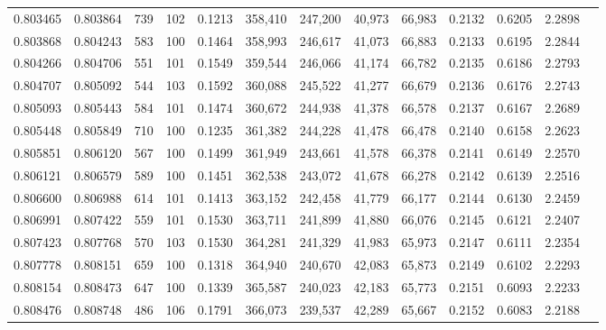 \begin{tabular}{rrrrrrrrrrrrr}
0.803465 & 0.803864 &   739 & 102 &                                     0.1213 & 358,410 & 247,200 &  40,973 &  66,983 & 0.2132 & 0.6205 & 2.2898 \\
0.803868 & 0.804243 &   583 & 100 &                                     0.1464 & 358,993 & 246,617 &  41,073 &  66,883 & 0.2133 & 0.6195 & 2.2844 \\
0.804266 & 0.804706 &   551 & 101 &                                     0.1549 & 359,544 & 246,066 &  41,174 &  66,782 & 0.2135 & 0.6186 & 2.2793 \\
0.804707 & 0.805092 &   544 & 103 &                                     0.1592 & 360,088 & 245,522 &  41,277 &  66,679 & 0.2136 & 0.6176 & 2.2743 \\
0.805093 & 0.805443 &   584 & 101 &                                     0.1474 & 360,672 & 244,938 &  41,378 &  66,578 & 0.2137 & 0.6167 & 2.2689 \\
0.805448 & 0.805849 &   710 & 100 &                                     0.1235 & 361,382 & 244,228 &  41,478 &  66,478 & 0.2140 & 0.6158 & 2.2623 \\
0.805851 & 0.806120 &   567 & 100 &                                     0.1499 & 361,949 & 243,661 &  41,578 &  66,378 & 0.2141 & 0.6149 & 2.2570 \\
0.806121 & 0.806579 &   589 & 100 &                                     0.1451 & 362,538 & 243,072 &  41,678 &  66,278 & 0.2142 & 0.6139 & 2.2516 \\
0.806600 & 0.806988 &   614 & 101 &                                     0.1413 & 363,152 & 242,458 &  41,779 &  66,177 & 0.2144 & 0.6130 & 2.2459 \\
0.806991 & 0.807422 &   559 & 101 &                                     0.1530 & 363,711 & 241,899 &  41,880 &  66,076 & 0.2145 & 0.6121 & 2.2407 \\
0.807423 & 0.807768 &   570 & 103 &                                     0.1530 & 364,281 & 241,329 &  41,983 &  65,973 & 0.2147 & 0.6111 & 2.2354 \\
0.807778 & 0.808151 &   659 & 100 &                                     0.1318 & 364,940 & 240,670 &  42,083 &  65,873 & 0.2149 & 0.6102 & 2.2293 \\
0.808154 & 0.808473 &   647 & 100 &                                     0.1339 & 365,587 & 240,023 &  42,183 &  65,773 & 0.2151 & 0.6093 & 2.2233 \\
0.808476 & 0.808748 &   486 & 106 &                                     0.1791 & 366,073 & 239,537 &  42,289 &  65,667 & 0.2152 & 0.6083 & 2.2188 \\

\end{tabular}
